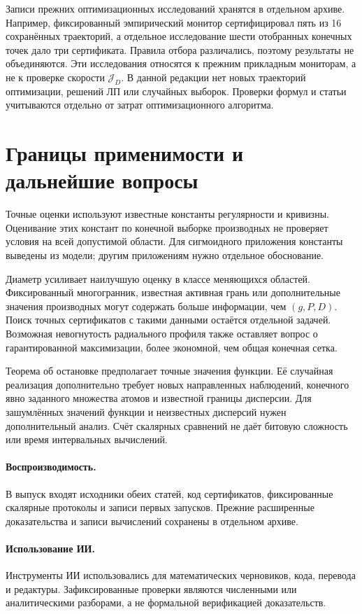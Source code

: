Записи прежних оптимизационных исследований хранятся в отдельном
архиве. Например, фиксированный эмпирический монитор
сертифицировал пять из 16 сохранённых траекторий, а отдельное
исследование шести отобранных конечных точек дало три сертификата.
Правила отбора различались, поэтому результаты не объединяются.
Эти исследования относятся к прежним прикладным мониторам,
а не к проверке скорости $\mathcal J_D$. В данной редакции нет
новых траекторий оптимизации, решений ЛП или случайных выборок.
Проверки формул и статьи учитываются отдельно от затрат
оптимизационного алгоритма.

\section{Границы применимости и дальнейшие вопросы}
Точные оценки используют известные константы регулярности и кривизны.
Оценивание этих констант по конечной выборке производных не проверяет
условия на всей допустимой области. Для сигмоидного приложения
константы выведены из модели; другим приложениям нужно отдельное
обоснование.

Диаметр усиливает наилучшую оценку в классе меняющихся областей.
Фиксированный многогранник, известная активная грань или дополнительные
значения производных могут содержать больше информации, чем
$(g,P,D)$. Поиск точных сертификатов с такими данными остаётся
отдельной задачей. Возможная невогнутость радиального профиля также
оставляет вопрос о гарантированной максимизации, более экономной,
чем общая конечная сетка.

Теорема об остановке предполагает точные значения функции.
Её случайная реализация дополнительно требует новых направленных
наблюдений, конечного явно заданного множества атомов и известной
границы дисперсии. Для зашумлённых значений функции и неизвестных
дисперсий нужен дополнительный анализ. Счёт скалярных сравнений
не даёт битовую сложность или время интервальных вычислений.

\paragraph{Воспроизводимость.}
В выпуск входят исходники обеих статей, код сертификатов,
фик\-си\-ро\-ван\-ные скалярные протоколы и записи первых запусков.
Прежние расширенные доказательства и записи вычислений
сохранены в отдельном архиве.

\paragraph{Использование ИИ.}
Инструменты ИИ использовались для математических черновиков, кода,
перевода и редактуры. Зафиксированные проверки являются численными
или аналитическими разборами, а не формальной верификацией доказательств.
